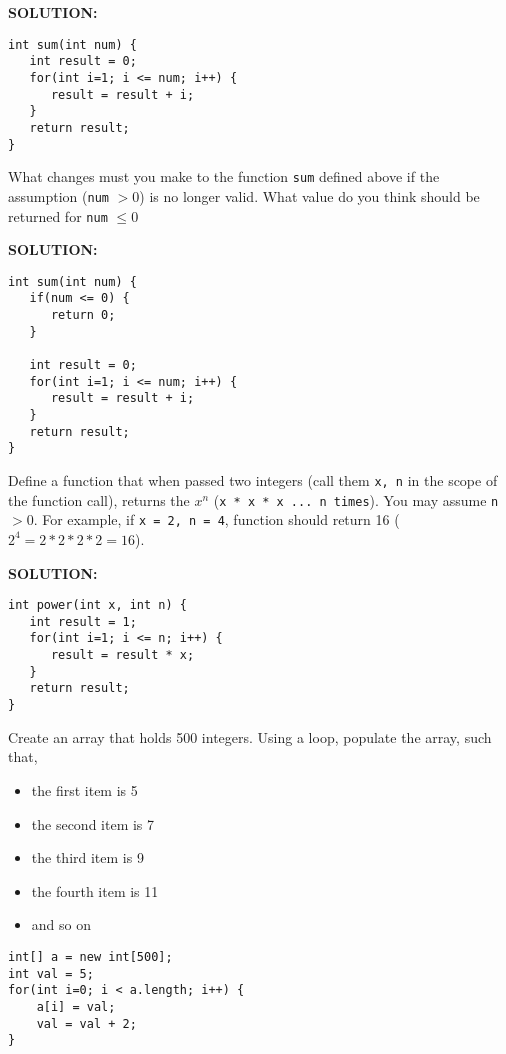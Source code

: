 \documentclass[11pt]{exam}
\begin{document}
\begin{questions}
\ifprintanswers \vskip 1cm \textbf{SOLUTION:} \vskip 1cm
\begin{lstlisting}
int sum(int num) {
   int result = 0;
   for(int i=1; i <= num; i++) {
      result = result + i;
   }
   return result;
}
\end{lstlisting}
\newpage \else
\newpage
\fi

\question
What changes must you make to the function \texttt{sum} defined above if the assumption (\texttt{num} $> 0$) is no longer valid. What value do you think should be returned for \texttt{num} $\leq 0$

\ifprintanswers \vskip 1cm \textbf{SOLUTION:} \vskip 1cm
\begin{lstlisting}
int sum(int num) {
   if(num <= 0) {
      return 0;
   }
   
   int result = 0;
   for(int i=1; i <= num; i++) {
      result = result + i;
   }
   return result;
}
\end{lstlisting}
\newpage \else
\vskip 5cm
\fi

\question
Define a function that when passed two integers (call them \texttt{x, n} in the scope of the function call), returns the $x^n$ (\texttt{x * x * x ... n times}). You may assume \texttt{n} $> 0$. For example, if \texttt{x = 2, n = 4}, function should return 16 ($2^4 = 2*2*2*2 = 16$).

\ifprintanswers \vskip 1cm \textbf{SOLUTION:} \vskip 1cm
\begin{lstlisting}
int power(int x, int n) {
   int result = 1;
   for(int i=1; i <= n; i++) {
      result = result * x;
   }
   return result;
}
\end{lstlisting}
\newpage \else
\newpage
\fi

\question Create an array that holds 500 integers. Using a loop, populate the array, such that,

\begin{itemize}
	\item the first item is 5
	\item the second item is 7
	\item the third item is 9
	\item the fourth item is 11
	\item and so on
\end{itemize} 

\ifprintanswers
\begin{lstlisting}
int[] a = new int[500];
int val = 5;
for(int i=0; i < a.length; i++) {
	a[i] = val;
	val = val + 2;
}
\end{lstlisting}
\newpage
\else \vskip 8cm
\fi


\end{questions}
\end{document}
